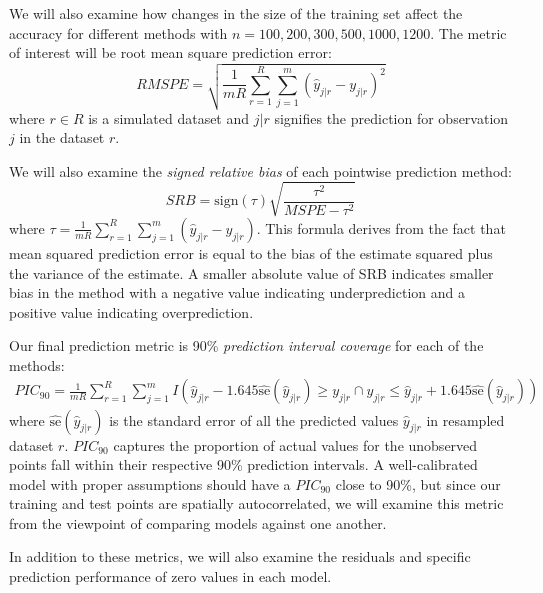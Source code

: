 \documentclass{article}
\begin{document}
We will also examine how changes in the size of the training set affect the accuracy for different methods with $n = 100, 200, 300, 500, 1000, 1200$.
The metric of interest will be root mean square prediction error:
$$
RMSPE = \sqrt{\frac{1}{mR} \sum_{r=1}^R \sum_{j=1}^m (\hat{y}_{j|r} - y_{j|r})^2}
$$
where $r \in R$ is a simulated dataset and $j|r$ signifies the prediction for observation $j$ in the dataset $r$.

We will also examine the \textit{signed relative bias} of each pointwise prediction method:
$$
SRB = \text{sign}(\tau) \sqrt{\frac{\tau^2}{MSPE - \tau^2}}
$$
where $\tau = \frac{1}{mR} \sum_{r = 1}^R \sum_{j = 1}^m (\hat{y}_{j|r} - y_{j|r})$.
This formula derives from the fact that mean squared prediction error is equal to the bias of the estimate squared plus the variance of the estimate.
A smaller absolute value of SRB indicates smaller bias in the method with a negative value indicating underprediction and a positive value indicating overprediction.\cite{verhoef13}

Our final prediction metric is 90\% \textit{prediction interval coverage} for each of the methods:
\begin{align*}
PIC_{90} = \frac{1}{mR} \sum_{r=1}^R \sum_{j=1}^m I\left(\hat{y}_{j|r} - 1.645\hat{\text{se}}(\hat{y}_{j|r}) \geq y_{j|r} \cap y_{j|r} \leq \hat{y}_{j|r} + 1.645\hat{\text{se}}(\hat{y}_{j|r})\right)
\end{align*}
where $\hat{\text{se}}(\hat{y}_{j|r})$ is the standard error of all the predicted values $\hat{y}_{j|r}$ in resampled dataset $r$.\cite{verhoef13}
$PIC_{90}$ captures the proportion of actual values for the unobserved points fall within their respective 90\% prediction intervals.
A well-calibrated model with proper assumptions should have a $PIC_{90}$ close to 90\%, but since our training and test points are spatially autocorrelated, we will examine this metric from the viewpoint of comparing models against one another. 

In addition to these metrics, we will also examine the residuals and specific prediction performance of zero values in each model.
\end{document}
